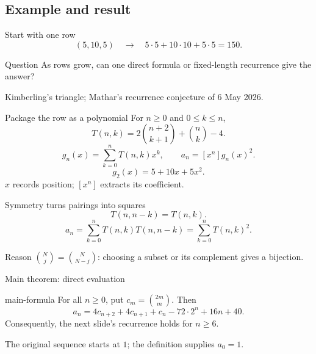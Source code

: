 \documentclass{beamer}
\begin{document}
\subsection{Example and result}
\begin{frame}{Start with one row}
\[
(5,10,5)\quad\longrightarrow\quad
5\cdot5+10\cdot10+5\cdot5=150.
\]
\begin{block}{Question}
As rows grow, can one direct formula or fixed-length recurrence give the answer?
\end{block}
Kimberling’s triangle; Mathar’s recurrence conjecture of 6 May 2026.
\end{frame}
\begin{frame}{Package the row as a polynomial}
\small
For $n\ge0$ and $0\le k\le n$,
\[
T(n,k)=2\binom{n+2}{k+1}+\binom nk-4.
\]
\[
g_n(x)=\sum_{k=0}^nT(n,k)x^k,\qquad a_n=[x^n]g_n(x)^2.
\]
\[
g_2(x)=5+10x+5x^2.
\]
$x$ records position; $[x^n]$ extracts its coefficient.
\end{frame}
\begin{frame}{Symmetry turns pairings into squares}
\[
T(n,n-k)=T(n,k).
\]
\[
a_n=\sum_{k=0}^nT(n,k)T(n,n-k)
    =\sum_{k=0}^nT(n,k)^2.
\]
\begin{block}{Reason}
$\binom Nj=\binom N{N-j}$: choosing a subset or its complement gives a bijection.
\end{block}
\end{frame}
\begin{frame}{Main theorem: direct evaluation}
\begin{bookresult}{main-formula}
For all $n\ge0$, put $c_m=\binom{2m}m$. Then
\[
a_n=4c_{n+2}+4c_{n+1}+c_n-72\cdot2^n+16n+40.
\]
Consequently, the next slide’s recurrence holds for $n\ge6$.
\end{bookresult}
The original sequence starts at $1$; the definition supplies $a_0=1$.
\end{frame}
\end{document}

